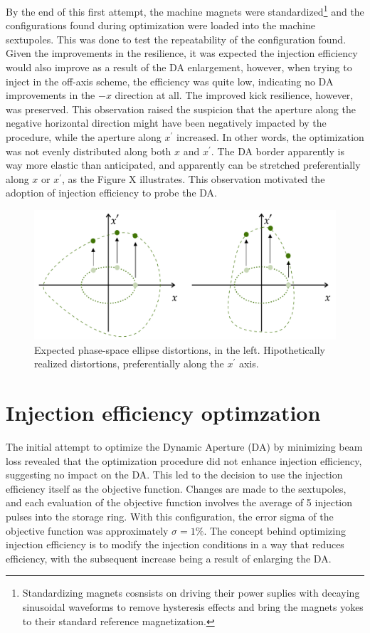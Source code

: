 By the end of this first attempt, the machine magnets were standardized\footnote{Standardizing magnets cosnsists on driving their power suplies with decaying sinusoidal waveforms to remove hysteresis effects and bring the magnets yokes to their standard reference magnetization.} and the configurations found during optimization were loaded into the machine sextupoles. This was done to test the repeatability of the configuration found. Given the improvements in the resilience, it was expected the injection efficiency would also improve as a result of the DA enlargement, however, when trying to inject in the off-axis scheme, the efficiency was quite low, indicating no DA improvements in the $-x$ direction at all. The improved kick resilience, however, was preserved. This observation raised the suspicion that the aperture along the negative horizontal direction might have been negatively impacted by the procedure, while the aperture along $x^\prime$ increased. In other words, the optimization was not evenly distributed along both $x$ and $x^\prime$. The DA border apparently is way more elastic than anticipated, and apparently can be stretched preferentially along $x$ or $x^\prime$, as the Figure X illustrates. This observation motivated the adoption of injection efficiency to probe the DA.
\begin{figure}
    \centering
    \includegraphics[width=\textwidth]{Images/elastic_phase_space_distortion.pdf}
    \caption{Expected phase-space ellipse distortions, in the left. Hipothetically realized distortions, preferentially along the $x^\prime$ axis.}
\end{figure}\section{Injection efficiency optimzation}
The initial attempt to optimize the Dynamic Aperture (DA) by minimizing beam loss revealed that the optimization procedure did not enhance injection efficiency, suggesting no impact on the DA. This led to the decision to use the injection efficiency itself as the objective function. Changes are made to the sextupoles, and each evaluation of the objective function involves the average of 5 injection pulses into the storage ring. With this configuration, the error sigma of the objective function was approximately $\sigma=1\%$. The concept behind optimizing injection efficiency is to modify the injection conditions in a way that reduces efficiency, with the subsequent increase being a result of enlarging the DA.

